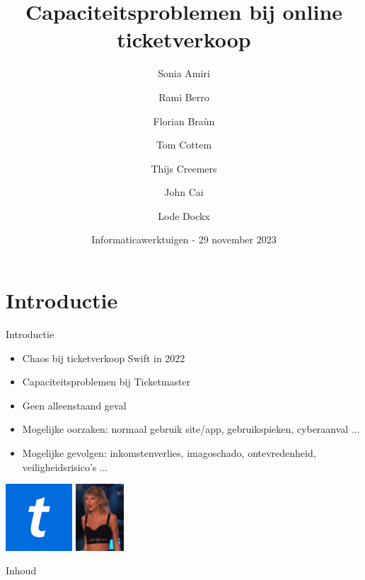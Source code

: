 \documentclass{beamer}
\title[Capaciteitsproblemen]{\Huge{Capaciteitsproblemen bij online ticketverkoop}}
\author[Groep 2]{Sonia Amiri \and Rami Berro \and Florian Braùn \and Tom Cottem \and Thijs Creemers \and John Cai \and Lode Dockx}
\date[IW]{\small{Informaticawerktuigen - 29 november 2023}}
\begin{document}
\begin{frame}
  \titlepage
\end{frame}


\section[Intro]{Introductie}
\begin{frame}{Introductie}
\begin{itemize}
    \item Chaos bij ticketverkoop Swift in 2022
    \item Capaciteitsproblemen bij Ticketmaster
    \item Geen alleenstaand geval
    \item Mogelijke oorzaken: normaal gebruik site/app, gebruikspieken, cyberaanval ...
    \item Mogelijke gevolgen: inkomstenverlies, imagoschado, ontevredenheid, veiligheidsrisico's ...
\end{itemize}
\includegraphics[height = 2.5cm]{ticketmaster-logo.png}
\includegraphics[height = 2.5cm]{taylor-swift.png}

\end{frame}


\begin{frame}{Inhoud}
  \tableofcontents
\end{frame}
\end{document}
